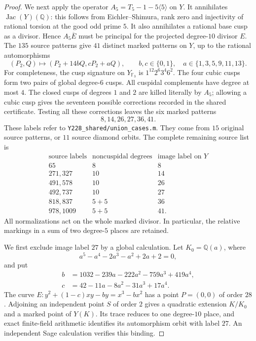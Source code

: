 \begin{proof}
We next apply the operator
$A_5=T_5-1-5\langle5\rangle$ on $Y$. It annihilates
$\operatorname{Jac}(Y)(\mathbb Q)$: this follows from
Eichler--Shimura, rank zero and injectivity of rational torsion
at the good odd prime $5$. It also annihilates a rational base
cusp as a divisor. Hence $A_5\overline E$ must be principal for
the projected degree-$10$ divisor $E$.
The $135$ source patterns give $41$ distinct marked patterns on
$Y$, up to the rational automorphisms
\[
 (P_2,Q)\longmapsto(P_2+14bQ,cP_2+aQ),\qquad
 b,c\in\{0,1\},\quad a\in\{1,3,5,9,11,13\}.
\]
For completeness, the cusp signature on $Y_{\mathbb F_3}$ is
$1^{12}2^6 3^4 6^2$. The four cubic cusps form two pairs of
global degree-$6$ cusps. All cuspidal complements have degree
at most $4$. The closed cusps of degrees $1$ and $2$ are killed
literally by $A_5$; allowing a cubic cusp gives the seventeen
possible corrections recorded in the shared certificate.
Testing all these corrections leaves the six marked patterns
\[
                       8,14,26,27,36,41.
\]
These labels refer to \texttt{Y228\_shared/union\_cases.m}.
They come from $15$ original source patterns, or $11$ source
diamond orbits. The complete remaining source list is
\[
\begin{array}{c|c|c}
 \text{source labels}&\text{noncuspidal degrees}&\text{image label on }Y\\\hline
 65&8&8\\
 271,327&10&14\\
 491,578&10&26\\
 492,737&10&27\\
 818,837&5+5&36\\
 978,1009&5+5&41.
\end{array}
\]
All normalizations act on the whole marked divisor. In particular,
the relative markings in a sum of two degree-$5$ places are retained.

We first exclude image label $27$ by a global calculation.
Let $K_0=\mathbb Q(a)$, where
\[
 a^5-a^4-2a^3-a^2+2a+2=0,
\]
and put
\[
 \begin{split}
 b&=1032-239a-222a^2-759a^3+419a^4,\\
 c&=42-11a-8a^2-31a^3+17a^4.
 \end{split}
\]
The curve $E:y^2+(1-c)xy-by=x^3-bx^2$ has a point
$P=(0,0)$ of order $28$. Adjoining an independent point $S$ of
order $2$ gives a quadratic extension $K/K_0$ and a marked point
of $Y(K)$. Its trace reduces to one degree-$10$ place, and exact
finite-field arithmetic identifies its automorphism orbit with
label $27$. An independent Sage calculation verifies this binding.


\end{proof}
